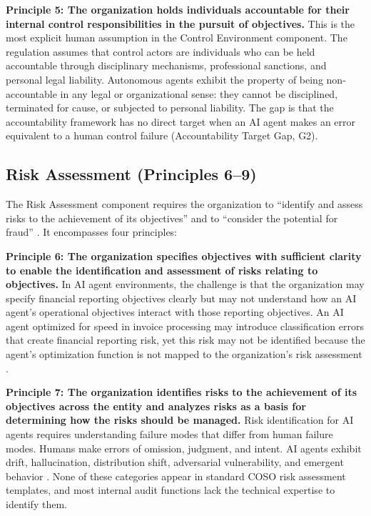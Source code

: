 \documentclass[12pt]{article}
\begin{document}
\textbf{Principle 5: The organization holds individuals accountable for their internal control responsibilities in the pursuit of objectives.} This is the most explicit human assumption in the Control Environment component. The regulation assumes that control actors are individuals who can be held accountable through disciplinary mechanisms, professional sanctions, and personal legal liability. Autonomous agents exhibit the property of being non-accountable in any legal or organizational sense: they cannot be disciplined, terminated for cause, or subjected to personal liability. The gap is that the accountability framework has no direct target when an AI agent makes an error equivalent to a human control failure (Accountability Target Gap, G2).

\subsection{Risk Assessment (Principles 6--9)}

The Risk Assessment component requires the organization to ``identify and assess risks to the achievement of its objectives'' and to ``consider the potential for fraud'' \citep{coso2013}. It encompasses four principles:

\textbf{Principle 6: The organization specifies objectives with sufficient clarity to enable the identification and assessment of risks relating to objectives.} In AI agent environments, the challenge is that the organization may specify financial reporting objectives clearly but may not understand how an AI agent's operational objectives interact with those reporting objectives. An AI agent optimized for speed in invoice processing may introduce classification errors that create financial reporting risk, yet this risk may not be identified because the agent's optimization function is not mapped to the organization's risk assessment \citep{agrawal2022}.

\textbf{Principle 7: The organization identifies risks to the achievement of its objectives across the entity and analyzes risks as a basis for determining how the risks should be managed.} Risk identification for AI agents requires understanding failure modes that differ from human failure modes. Humans make errors of omission, judgment, and intent. AI agents exhibit drift, hallucination, distribution shift, adversarial vulnerability, and emergent behavior \citep{nist2023}. None of these categories appear in standard COSO risk assessment templates, and most internal audit functions lack the technical expertise to identify them.
\end{document}
